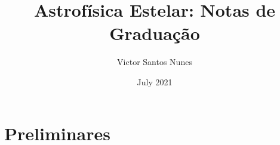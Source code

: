 \documentclass[a4paper, 12pt,openany,nodeprecatedcode]{book}
\title{Astrofísica Estelar: Notas de Graduação}
\author{Victor Santos Nunes}
\date{July 2021}
\begin{document}
 \frontmatter
 
\maketitle

\tableofcontents
\newpage

\mainmatter
\chapter{Preliminares}

\end{document}
